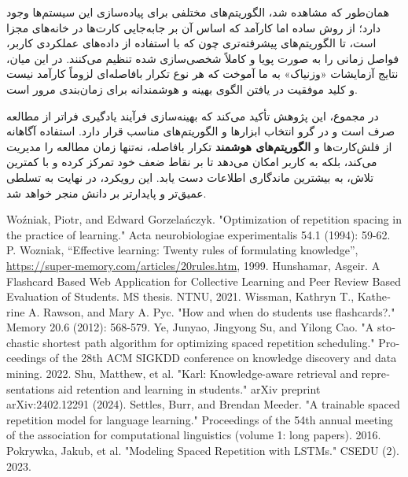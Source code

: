 \documentclass[12pt]{report}
\begin{document}
همان‌طور که مشاهده شد، الگوریتم‌های مختلفی برای پیاده‌سازی این سیستم‌ها وجود دارد؛ از روش ساده اما کارآمد  که اساس آن بر جابه‌جایی کارت‌ها در خانه‌های مجزا است، تا الگوریتم‌های پیشرفته‌تری چون  که با استفاده از داده‌های عملکردی کاربر، فواصل زمانی را به صورت پویا و کاملاً شخصی‌سازی شده تنظیم می‌کنند. در این میان، نتایج آزمایشات «وزنیاک» به ما آموخت که هر نوع تکرار بافاصله‌ای لزوماً کارآمد نیست و کلید موفقیت در یافتن الگوی بهینه و هوشمندانه برای زمان‌بندی مرور است.

در مجموع، این پژوهش تأکید می‌کند که بهینه‌سازی فرآیند یادگیری فراتر از مطالعه صرف است و در گرو انتخاب ابزارها و الگوریتم‌های مناسب قرار دارد. استفاده آگاهانه از فلش‌کارت‌ها و \textbf{الگوریتم‌های هوشمند} تکرار بافاصله، نه‌تنها زمان مطالعه را مدیریت می‌کند، بلکه به کاربر امکان می‌دهد تا بر نقاط ضعف خود تمرکز کرده و با کمترین تلاش، به بیشترین ماندگاری اطلاعات دست یابد. این رویکرد، در نهایت به تسلطی عمیق‌تر و پایدارتر بر دانش منجر خواهد شد.



\begin{thebibliography}{MM}
    \begin{latin}
            Woźniak, Piotr, and Edward Gorzelańczyk. "Optimization of repetition spacing in the practice of learning." Acta neurobiologiae experimentalis 54.1 (1994): 59-62.        
            P. Wozniak, ``Effective learning: Twenty rules of formulating knowledge'', 
            \url{https://super-memory.com/articles/20rules.htm}, 1999.
            Hunshamar, Asgeir. A Flashcard Based Web Application for Collective Learning and Peer Review Based Evaluation of Students. MS thesis. NTNU, 2021.
            Wissman, Kathryn T., Katherine A. Rawson, and Mary A. Pyc. "How and when do students use flashcards?." Memory 20.6 (2012): 568-579.
            Ye, Junyao, Jingyong Su, and Yilong Cao. "A stochastic shortest path algorithm for optimizing spaced repetition scheduling." Proceedings of the 28th ACM SIGKDD conference on knowledge discovery and data mining. 2022.
            Shu, Matthew, et al. "Karl: Knowledge-aware retrieval and representations aid retention and learning in students." arXiv preprint arXiv:2402.12291 (2024).
            Settles, Burr, and Brendan Meeder. "A trainable spaced repetition model for language learning." Proceedings of the 54th annual meeting of the association for computational linguistics (volume 1: long papers). 2016.
            Pokrywka, Jakub, et al. "Modeling Spaced Repetition with LSTMs." CSEDU (2). 2023.

    \end{latin}
\end{thebibliography}
\end{document}
